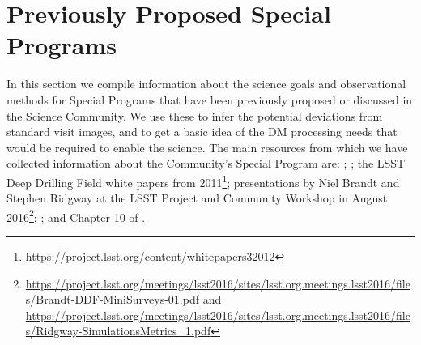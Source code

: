 \documentclass[DM,lsstdoc,toc]{lsstdoc}
\begin{document}
\clearpage
\appendix

\section{Previously Proposed Special Programs}\label{sec:data_prev}

In this section we compile information about the science goals and observational methods for Special Programs that have been previously proposed or discussed in the Science Community. We use these to infer the potential deviations from standard visit images, and to get a basic idea of the DM processing needs that would be required to enable the science. The main resources from which we have collected information about the Community's Special Program are: \citep{2008arXiv0805.2366I}; \citep{LPM-17}; the LSST Deep Drilling Field white papers from 2011\footnote{\url{https://project.lsst.org/content/whitepapers32012}}; presentations by Niel Brandt and Stephen Ridgway at the LSST Project and Community Workshop in August 2016\footnote{\url{https://project.lsst.org/meetings/lsst2016/sites/lsst.org.meetings.lsst2016/files/Brandt-DDF-MiniSurveys-01.pdf} and \url{https://project.lsst.org/meetings/lsst2016/sites/lsst.org.meetings.lsst2016/files/Ridgway-SimulationsMetrics_1.pdf}}; \citep{2013arXiv1304.3455G}; and Chapter 10 of \citep{2017arXiv170804058L}.

\end{document}

